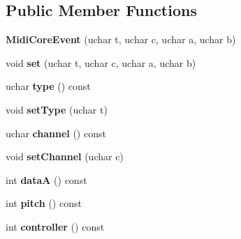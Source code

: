 \subsection*{Public Member Functions}
\begin{DoxyCompactItemize}
\item 
\mbox{\label{class_ms_1_1_midi_core_event_af3cc6f20b9ad5dd38e73d4a74ad72b4a}} 
{\bfseries Midi\+Core\+Event} (uchar t, uchar c, uchar a, uchar b)
\item 
\mbox{\label{class_ms_1_1_midi_core_event_a705e61b109956bfdfa19f2bb88d2fa18}} 
void {\bfseries set} (uchar t, uchar c, uchar a, uchar b)
\item 
\mbox{\label{class_ms_1_1_midi_core_event_a9238edae1ed9e9791f29e236a2b2869e}} 
uchar {\bfseries type} () const
\item 
\mbox{\label{class_ms_1_1_midi_core_event_a6134f996846a04ff74e444652b7bcaf0}} 
void {\bfseries set\+Type} (uchar t)
\item 
\mbox{\label{class_ms_1_1_midi_core_event_a963cbc39d5b5d81ab3b049495503a572}} 
uchar {\bfseries channel} () const
\item 
\mbox{\label{class_ms_1_1_midi_core_event_a9a3b8dfdb3b6a9546f242ab764f2b3ab}} 
void {\bfseries set\+Channel} (uchar c)
\item 
\mbox{\label{class_ms_1_1_midi_core_event_adbdd0b370f699abb1a0b84ff3c0c28dc}} 
int {\bfseries dataA} () const
\item 
\mbox{\label{class_ms_1_1_midi_core_event_ab4198219ccb2c53a4f0e2862dcbb7662}} 
int {\bfseries pitch} () const
\item 
\mbox{\label{class_ms_1_1_midi_core_event_af57e74b47873993894832cdc79c1891b}} 
int {\bfseries controller} () const
\item 
\mbox{\label{class_ms_1_1_midi_core_event_af2cdbe5f1d195e020f3ec2879f83c7ff}} 

\end{DoxyCompactItemize}
